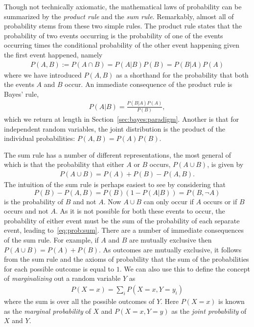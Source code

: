Though not technically axiomatic, the mathematical laws of probability can be summarized by the \emph{product rule}
and the \emph{sum rule}.  Remarkably, almost all of probability stems from these two simple rules.
The product rule states that the probability of two events occurring is the probability of one of the events
occurring times the conditional probability of the other event happening given the first event happened, namely
\begin{align}
\label{eq:prob:prod}
P(A,B) := P(A \cap B) = P(A|B) P(B) =  P(B|A) P(A)
\end{align}
where we have introduced $P(A,B)$ as a shorthand for the probability that both the events $A$ and $B$ occur.
An immediate consequence of the product rule is Bayes' rule,
\begin{align}
P(A|B) = \frac{P(B|A)P(A)}{P(B)},
\end{align}
which we return at length in Section~\ref{sec:bayes:paradigm}.
Another is that for independent random variables, the joint distribution is the product of the
individual probabilities: $P(A,B)=P(A)P(B)$.

The sum rule has a number of different representations, the most general of which is that 
the probability that either $A$ or $B$ occurs, $P(A\cup B)$, is given by
\begin{align}
\label{eq:prob:sum}
P(A \cup B) = P(A) + P(B) - P(A, B).
\end{align}
The intuition of the sum rule is perhaps easiest to see by considering that
\[
P(B) - P(A, B) = P(B)(1-P(A|B)) = P(B, \neg A)
\]
 is the probability of $B$ and 
not $A$.  Now $A\cup B$ can only occur if $A$ occurs or if $B$ occurs and not $A$.  As it is not
possible for both these events to occur, the probability of either event must be the sum of the
probability of each separate event, leading to~\eqref{eq:prob:sum}.
There are a number of immediate consequences of the sum rule.  For example, if $A$ and $B$ are
mutually exclusive then $P(A\cup B) = P(A) + P(B)$.  As outcomes are mutually exclusive, it
follows from the sum rule and the axioms of probability that the sum of the probabilities
for each possible outcome is equal to $1$.  We can also use this to
define the concept of \emph{marginalizing} out a random variable $Y$ as
\begin{align}
\label{eq:prob:marginal}
P(X=x) = \sum_{i} P(X=x,Y=y_i)
\end{align}
where the sum is over all the possible outcomes of $Y$.  Here $P(X=x)$ is known as the
\emph{marginal probability} of $X$ and $P(X=x,Y=y)$ as the \emph{joint probability} of $X$
and $Y$.

